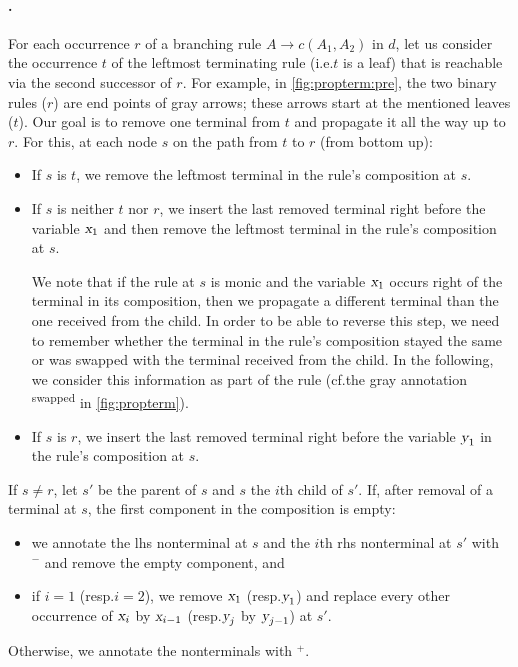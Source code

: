\documentclass[../document.tex]{subfiles}
\begin{document}
    \paragraph{.}
    For each occurrence \(r\) of a branching rule $A \to c(A_1, A_2)$ in \(d\), let us consider the occurrence \(t\) of the leftmost terminating rule (i.e.\@ \(t\) is a leaf) that is reachable via the second successor of \(r\).
    For example, in \cref{fig:propterm:pre}, the two binary rules (\(r\)) are end points of gray arrows; these arrows start at the mentioned leaves (\(t\)).
    Our goal is to remove one terminal from $t$ and propagate it all the way up to $r$.
    For this, at each node \(s\) on the path from \(t\) to \(r\) (from bottom up):
    \begin{itemize}[nosep]
        \item If \(s\) is \(t\), we remove the leftmost terminal in the rule's composition at \(s\).
        \item
        If \(s\) is neither \(t\) nor \(r\), we insert the last removed terminal right before the variable \(\textsl{x}_1\) and then remove the leftmost terminal in the rule's composition at \(s\).

        We note that if the rule at $s$ is monic and the variable $\textsl{x}_1$ occurs right of the terminal in its composition, then we propagate a different terminal than the one received from the child.
        In order to be able to reverse this step, we need to remember whether the terminal in the rule's composition stayed the same or was swapped with the terminal received from the child.
        In the following, we consider this information as part of the rule (cf.\@ the gray annotation \textsuperscript{swapped} in \cref{fig:propterm}).
        \item If \(s\) is \(r\), we insert the last removed terminal right before the variable \(\textsl{y}_1\) in the rule's composition at \(s\).
    \end{itemize}
    If \(s \neq r\), let \(s'\) be the parent of $s$ and $s$ the \(i\)th child of $s'$.
    If, after removal of a terminal at \(s\), the first component in the composition is empty:
    \begin{itemize}[noitemsep,topsep=1pt]
        \item we annotate the lhs nonterminal at \(s\) and the \(i\)th rhs nonterminal at \(s'\) with $^-$ and remove the empty component, and
        \item if \(i = 1\) (resp.\@ \(i = 2\)), we remove \(\textsl{x}_1\) (resp.\@ \(\textsl{y}_1\)) and replace every other occurrence of \(\textsl{x}_i\) by \(\textsl{x}_{i-1}\) (resp.\@ \(\textsl{y}_j\) by \(\textsl{y}_{j-1}\)) at $s'$.
    \end{itemize}
    Otherwise, we annotate the nonterminals with \(^+\).
\end{document}
